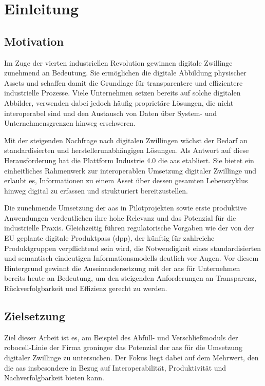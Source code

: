 \thispagestyle{fancy}
\section{Einleitung}
\subsection{Motivation}
\label{sec:Motivation}
Im Zuge der vierten industriellen Revolution gewinnen digitale Zwillinge zunehmend an Bedeutung. 
Sie ermöglichen die digitale Abbildung physischer Assets und schaffen damit die Grundlage für transparentere und effizientere industrielle Prozesse. 
Viele Unternehmen setzen bereits auf solche digitalen Abbilder, verwenden dabei jedoch häufig proprietäre Lösungen, die nicht interoperabel sind und den Austausch von Daten über System- und Unternehmensgrenzen hinweg erschweren.

Mit der steigenden Nachfrage nach digitalen Zwillingen wächst der Bedarf an standardisierten und herstellerunabhängigen Lösungen. 
Als Antwort auf diese Herausforderung hat die Plattform Industrie 4.0 die \acs{aas} etabliert. 
Sie bietet ein einheitliches Rahmenwerk zur interoperablen Umsetzung digitaler Zwillinge und erlaubt es, Informationen zu einem Asset über dessen gesamten Lebenszyklus hinweg digital zu erfassen und strukturiert bereitzustellen.

Die zunehmende Umsetzung der \acs{aas} in Pilotprojekten sowie erste produktive Anwendungen verdeutlichen ihre hohe Relevanz und das Potenzial für die industrielle Praxis. 
Gleichzeitig führen regulatorische Vorgaben wie der von der EU geplante digitale Produktpass (\acs{dpp}), der künftig für zahlreiche Produktgruppen verpflichtend sein wird, die Notwendigkeit eines standardisierten und semantisch eindeutigen Informationsmodells deutlich vor Augen.
Vor diesem Hintergrund gewinnt die Auseinandersetzung mit der \acs{aas} für Unternehmen bereits heute an Bedeutung, um den steigenden Anforderungen an Transparenz, Rückverfolgbarkeit und Effizienz gerecht zu werden.

\subsection{Zielsetzung}

Ziel dieser Arbeit ist es, am Beispiel des Abfüll- und Verschließmoduls der robocell-Linie der Firma groninger das Potenzial der \acs{aas} für die Umsetzung digitaler Zwillinge zu untersuchen. 
Der Fokus liegt dabei auf dem Mehrwert, den die \acs{aas} insbesondere in Bezug auf Interoperabilität, Produktivität und Nachverfolgbarkeit bieten kann. 

